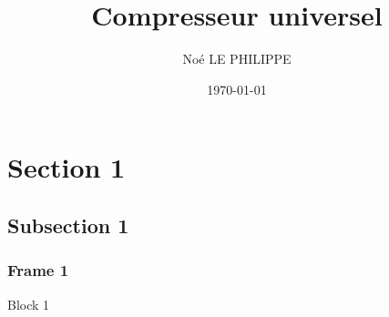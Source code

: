 \documentclass{beamer}
\title{Compresseur universel}
\author{Noé LE PHILIPPE}
\institute{}
\date{\today}
\begin{document}
\begin{frame}
  \titlepage
\end{frame}

\section{Section 1}
\subsection{Subsection 1}
\begin{frame}
  \frametitle{Frame 1}

  \begin{block}{Block 1}
  \end{block}
  \pause
\end{frame}
\end{document}
